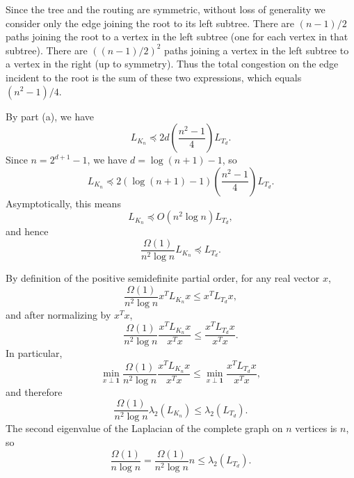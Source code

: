 \documentclass{article}
\newcommand{\1}{\mathbf{1}}
\newcommand{\0}{\mathbf{0}}
\begin{document}
\begin{enumerate}
\begin{enumerate}
    Since the tree and the routing are symmetric, without loss of generality we consider only the edge joining the root to its left subtree.
    There are $(n - 1) / 2$ paths joining the root to a vertex in the left subtree (one for each vertex in that subtree).
    There are $((n - 1) / 2)^2$ paths joining a vertex in the left subtree to a vertex in the right (up to symmetry).
    Thus the total congestion on the edge incident to the root is the sum of these two expressions, which equals $(n^2 - 1) / 4$.

    By part (a), we have
    \begin{equation*}
      L_{K_n} \preceq 2d \left(\frac{n^2 - 1}{4}\right) L_{T_d}.
    \end{equation*}
    Since $n = 2^{d + 1} - 1$, we have $d = \log(n + 1) - 1$, so
    \begin{equation*}
      L_{K_n} \preceq 2 (\log(n + 1) - 1) \left(\frac{n^2 - 1}{4}\right) L_{T_d}.
    \end{equation*}
    Asymptotically, this means
    \begin{equation*}
      L_{K_n} \preceq O(n^2 \log n) L_{T_d},
    \end{equation*}
    and hence
    \begin{equation*}
      \frac{\Omega(1)}{n^2 \log n} L_{K_n} \preceq L_{T_d}.
    \end{equation*}

    By definition of the positive semidefinite partial order, for any real vector $x$,
    \begin{equation*}
      \frac{\Omega(1)}{n^2 \log n} x^T L_{K_n} x \leq x^T L_{T_d} x,
    \end{equation*}
    and after normalizing by $x^T x$,
    \begin{equation*}
      \frac{\Omega(1)}{n^2 \log n} \frac{x^T L_{K_n} x}{x^T x} \leq \frac{x^T L_{T_d} x}{x^T x}.
    \end{equation*}
    In particular,
    \begin{equation*}
      \min_{x \perp \1} \frac{\Omega(1)}{n^2 \log n} \frac{x^T L_{K_n} x}{x^T x} \leq \min_{x \perp \1} \frac{x^T L_{T_d} x}{x^T x},
    \end{equation*}
    and therefore
    \begin{equation*}
      \frac{\Omega(1)}{n^2 \log n} \lambda_2(L_{K_n}) \leq \lambda_2(L_{T_d}).
    \end{equation*}
    The second eigenvalue of the Laplacian of the complete graph on $n$ vertices is $n$, so
    \begin{equation*}
      \frac{\Omega(1)}{n \log n} = \frac{\Omega(1)}{n^2 \log n} n \leq \lambda_2(L_{T_d}).
    \end{equation*}
  \end{enumerate}
\end{enumerate}

\end{document}
